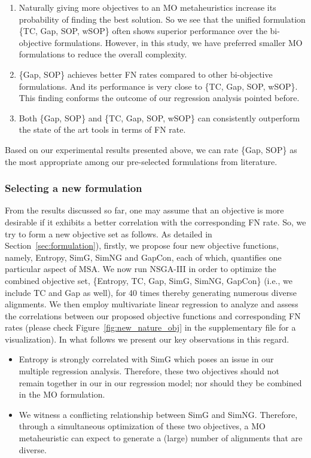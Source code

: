 \begin{enumerate}
	\item Naturally giving more objectives to an MO metaheuristics increase its probability of finding the best solution. So we see that the unified formulation \{TC, Gap, SOP, wSOP\} often shows superior performance over the bi-objective formulations. However, in this study, we have preferred smaller MO formulations to reduce the overall complexity.
\item \{Gap, SOP\} achieves better FN rates compared to other bi-objective formulations. And its performance is very close to \{TC, Gap, SOP, wSOP\}. This finding conforms the outcome of our regression analysis pointed before.
	\item Both \{Gap, SOP\} and \{TC, Gap, SOP, wSOP\} can consistently outperform the state of the art tools in terms of FN rate.
\end{enumerate}
Based on our experimental results presented above, we can rate \{Gap, SOP\} as the most appropriate among our pre-selected formulations from literature. 


\subsubsection{Selecting a new formulation}
\label{sec:new_msa_formulation}
From the results discussed so far, one may assume that an objective is more desirable if it exhibits a better correlation with the corresponding FN rate.  
So, we try to form a new objective set as follows. As detailed in Section~\ref{sec:formulation}), firstly, we propose four new objective functions, namely, Entropy, SimG, SimNG and GapCon, each of which, quantifies one particular aspect of MSA. We now run NSGA-III in order to optimize the combined objective set, \{Entropy, TC, Gap, SimG, SimNG, GapCon\} (i.e., we include TC and Gap as well), for 40 times thereby generating numerous diverse alignments.
We then employ multivariate linear regression to analyze and assess the correlations between our proposed objective functions and corresponding FN rates (please check Figure~\ref{fig:new_nature_obj} in the supplementary file for a visualization). In what follows we present our key observations in this regard.
\begin{itemize}
	\item Entropy is strongly correlated with SimG which poses an issue in our multiple regression analysis. Therefore, these two objectives should not remain together in our in our regression model; nor should they be combined in the MO formulation.
	
	\item We witness a conflicting relationship between SimG and SimNG. Therefore, through a simultaneous optimization of these two objectives, a MO metaheuristic can expect to generate a (large) number of alignments that are diverse.
\end{itemize}

